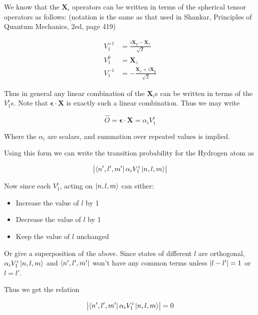 \question


We know that the $\mathbf{X}_i$ operators can be written in terms of the spherical tensor operators as follows: (notation is the same as that used in Shankar, Principles of Quantum Mechanics, 2ed, page 419)

\begin{equation}
    \begin{split}
        V^{+1}_1 &= \frac{i \mathbf{X}_y - \mathbf{X}_x}{\sqrt{2}} \\
        V^0_1 &= \mathbf{X}_z \\
        V^{-1}_1 &= -\frac{\mathbf{X}_x + i \mathbf{X}_y}{\sqrt{2}} 
    \end{split}
\end{equation}

Thus in general any linear combination of the $\mathbf{X}_i$s can be written in terms of the $V^i_1$s. Note that $\mathbf{\epsilon} \cdot \mathbf{X}$ is exactly such a linear combination. Thus we may write 

\begin{equation}
    \hat{O} = \mathbf{\epsilon} \cdot \mathbf{X} = \alpha_i V^i_1
\end{equation}
    
Where the $\alpha_i$ are scalars, and summation over repeated values is implied. 

Using this form we can write the transition probability for the Hydrogen atom as

\begin{equation}
    \abs{\bra{n',l',m'} \alpha_i V^i_1 \ket{n,l,m}}
\end{equation}

Now since each $V^i_1$, acting on $ \ket{n,l,m}$ can either:
\begin{itemize}
    \item Increase the value of $l$ by 1
    \item Decrease the value of $l$ by 1
    \item Keep the value of $l$ unchanged
\end{itemize}

Or give a superposition of the above. Since states of different $l$ are orthogonal, $\alpha_i V^i_1 \ket{n,l,m}$ and $\bra{n',l',m'}$ won't have any common terms unless $\abs{l - l'} = 1$ or $l = l'$. 

Thus we get the relation 

\begin{equation}
    \abs{\bra{n',l',m'} \alpha_i V^i_1 \ket{n,l,m}} = 0 
\end{equation}

